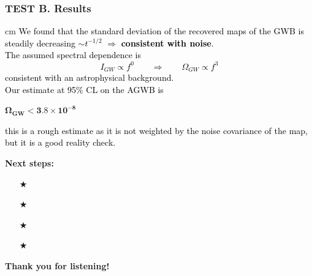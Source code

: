 \documentclass[handout]{beamer}
\begin{document}
{\begin{frame}
\end{frame}

 \begin{frame}
\frametitle{\textcolor{textcoldark}{TEST B. Results}}
 cm
\normalsize
\textcolor{black}{We found that the standard deviation of the recovered maps of the GWB is steadily decreasing $\sim t^{-1/2}$ $\Rightarrow$ {\bf consistent with noise}.\\
\smallskip
The assumed spectral dependence is 
$$
I_{GW} \propto f^0 \qquad \Rightarrow \qquad \Omega_{GW} \propto f^{3}
$$
consistent with an astrophysical background.\\
\medskip
Our estimate at 95\% CL on the AGWB is }
\begin{block}{}
\centering
\textcolor{textcol}{$\bm{\Omega_{\bm GW} < \bm 3.8 \times 10^{-8}}$}
\end{block}
\textcolor{black}{
this is a rough estimate as it is not weighted by the noise covariance of the map, but it is a good reality check.
}

\end{frame}

}

\begin{frame}[plain]
\LARGE
\textcolor{textcol}{\bf Next steps:}\\
\large
\bigskip
\bigskip
\begin{itemize}
    \item[$\bigstar$] \textcolor{white}{Analyse O1 data with different spectral laws (eg. for CGWB)}\hfill
    \item[$\bigstar$] \textcolor{white}{ Include polarisation reconstruction (Q, U, V)}
    \item[$\bigstar$] \textcolor{white}{ Generalize to other detector types: LISA, PTAs}
    \item[$\bigstar$] \textcolor{white}{ Produce model-based input maps and test reconstruction}
\end{itemize}
\medskip
\Large

\begin{center}
\textbf{\textcolor{textcol}{Thank you for listening!}}
\end{center}
\end{frame}
\end{document}
